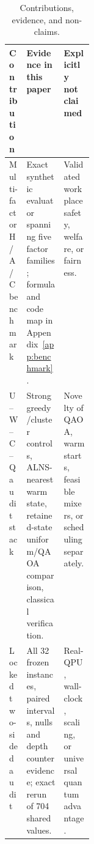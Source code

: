 \begin{table}[t]
\centering
\caption{Contributions, evidence, and non-claims.}
\label{tab:contributions}
\small
\begin{tabularx}{\linewidth}{@{}p{0.16\linewidth}XX@{}}
\toprule
Contribution & Evidence in this paper & Explicitly not claimed \\
\midrule
Multi-factor H/A/C benchmark & Exact synthetic evaluator spanning five factor families; formula and code map in Appendix~\ref{app:benchmark}. & Validated workplace safety, welfare, or fairness. \\
\textsc{U--W--C--Q} audit stack & Strong greedy/cluster controls, ALNS-nearest warm state, retained-state uniform/QAOA comparison, classical verification. & Novelty of QAOA, warm starts, feasible mixers, or scheduling separately. \\
Locked two-sided audit & All 32 frozen instances, paired intervals, nulls and depth counterevidence; exact rerun of 704 shared values. & Real-QPU, wall-clock, scaling, or universal quantum advantage. \\
\bottomrule
\end{tabularx}
\end{table}

